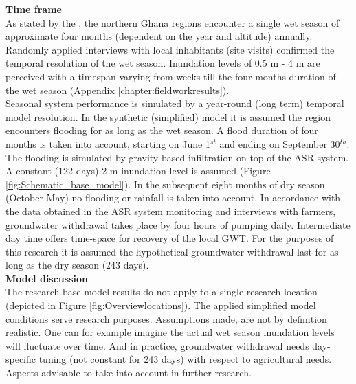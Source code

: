 \textbf{Time frame} \\
As stated by the \citet{HAP2011}, the northern Ghana regions encounter a single wet season of approximate four months (dependent on the year and altitude) annually. Randomly applied interviews with local inhabitants (site visits) confirmed the temporal resolution of the wet season. Inundation levels of 0.5 m - 4 m are perceived with a timespan varying from weeks till the four months duration of the wet season (Appendix \ref{chapter:fieldworkresults}). \\
Seasonal system performance is simulated by a year-round (long term) temporal model resolution. In the synthetic (simplified) model it is assumed the region encounters flooding for as long as the wet season. A flood duration of four months is taken into account, starting on June 1$^{st}$ and ending on September 30$^{th}$. The flooding is simulated by gravity based infiltration on top of the ASR system. A constant (122 days) 2 m inundation level is assumed (Figure \ref{fig:Schematic_base_model}). In the subsequent eight months of dry season (October-May) no flooding or rainfall is taken into account. In accordance with the data obtained in the ASR system monitoring and interviews with farmers, groundwater withdrawal takes place by four hours of pumping daily. Intermediate day time offers time-space for recovery of the local GWT. For the purposes of this research it is assumed the hypothetical groundwater withdrawal last for as long as the dry season (243 days). \\


\textbf{Model discussion} \\
The research base model results do not apply to a single research location (depicted in Figure \ref{fig:Overviewlocations}). The applied simplified model conditions serve research purposes. Assumptions made, are not by definition realistic. One can for example imagine the actual wet season inundation levels will fluctuate over time. And in practice, groundwater withdrawal needs day-specific tuning (not constant for 243 days) with respect to agricultural needs. Aspects advisable to take into account in further research.\\

